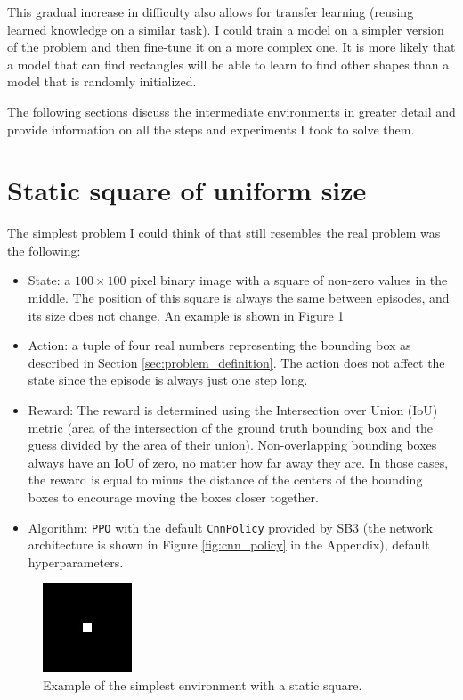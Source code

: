\documentclass[
  digital,     %
  oneside,     %
  nosansbold,  %
  nocolorbold, %
  lof,         %
  lot,         %
]{fithesis4}
\begin{document}
This gradual increase in difficulty also allows for transfer learning (reusing learned knowledge on a similar task). I could train a model on a simpler version of the problem and then fine-tune it on a more complex one. It is more likely that a model that can find rectangles will be able to learn to find other shapes than a model that is randomly initialized.

The following sections discuss the intermediate environments in greater detail and provide information on all the steps and experiments I took to solve them.

\section{Static square of uniform size}
The simplest problem I could think of that still resembles the real problem was the following:
\begin{itemize}
    \item State: a $100\times100$ pixel binary image with a square of non-zero values in the middle. The position of this square is always the same between episodes, and its size does not change. An example is shown in Figure \ref{fig:env0}
    \item Action: a tuple of four real numbers representing the bounding box as described in Section \ref{sec:problem_definition}. The action does not affect the state since the episode is always just one step long.
    \item Reward: The reward is determined using the Intersection over Union (IoU) metric (area of the intersection of the ground truth bounding box and the guess divided by the area of their union). Non-overlapping bounding boxes always have an IoU of zero, no matter how far away they are. In those cases, the reward is equal to minus the distance of the centers of the bounding boxes to encourage moving the boxes closer together.
    \item Algorithm: \texttt{PPO} with the default \texttt{CnnPolicy} provided by SB3 (the network architecture is shown in Figure \ref{fig:cnn_policy} in the Appendix), default hyperparameters.
\end{itemize}

\begin{figure}
    \includegraphics[width=0.5\linewidth]{env_examples/env0.jpg}
    \caption{Example of the simplest environment with a static square.}
    \label{fig:env0}
\end{figure}
\end{document}
